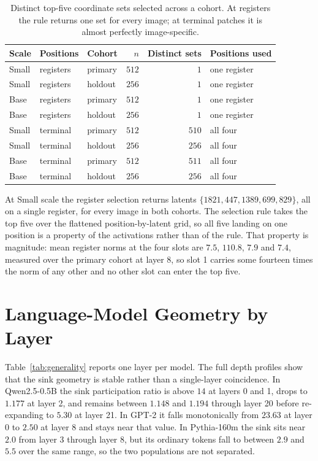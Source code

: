 \documentclass{article}
\begin{document}
\begin{table}[h]
\centering
\caption{Distinct top-five coordinate sets selected across a cohort. At registers the rule returns one set for every image; at terminal patches it is almost perfectly image-specific.}
\label{tab:selection}
\begin{tabular}{lllrrl}
\toprule
Scale & Positions & Cohort & $n$ & Distinct sets & Positions used \\
\midrule
Small & registers & primary & $512$ & $1$   & one register \\
Small & registers & holdout & $256$ & $1$   & one register \\
Base  & registers & primary & $512$ & $1$   & one register \\
Base  & registers & holdout & $256$ & $1$   & one register \\
Small & terminal  & primary & $512$ & $510$ & all four \\
Small & terminal  & holdout & $256$ & $256$ & all four \\
Base  & terminal  & primary & $512$ & $511$ & all four \\
Base  & terminal  & holdout & $256$ & $256$ & all four \\
\bottomrule
\end{tabular}
\end{table}

At Small scale the register selection returns latents $\{1821, 447, 1389, 699, 829\}$, all on a single register, for every image in both cohorts. The selection rule takes the top five over the flattened position-by-latent grid, so all five landing on one position is a property of the activations rather than of the rule. That property is magnitude: mean register norms at the four slots are $7.5$, $110.8$, $7.9$ and $7.4$, measured over the primary cohort at layer 8, so slot 1 carries some fourteen times the norm of any other and no other slot can enter the top five.

\section{Language-Model Geometry by Layer}
\label{app:llm}

Table~\ref{tab:generality} reports one layer per model. The full depth profiles show that the sink geometry is stable rather than a single-layer coincidence. In Qwen2.5-0.5B the sink participation ratio is above $14$ at layers 0 and 1, drops to $1.177$ at layer 2, and remains between $1.148$ and $1.194$ through layer 20 before re-expanding to $5.30$ at layer 21. In GPT-2 it falls monotonically from $23.63$ at layer 0 to $2.50$ at layer 8 and stays near that value. In Pythia-160m the sink sits near $2.0$ from layer 3 through layer 8, but its ordinary tokens fall to between $2.9$ and $5.5$ over the same range, so the two populations are not separated.
\end{document}
